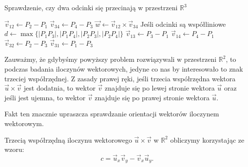 \begin{algorithm}[H]
	\caption{Sprawdzenie, czy dwa odcinki się przecinają w przestrzeni $\mathbb{R}^3$}
	\begin{algorithmic}[1]
		\State \Return \true
		\EndIf
		\State $\vec{v}_{12} \gets P_2 - P_1$
		\State $\vec{v}_{34} \gets P_4 - P_3$
		\State $\vec{w} \gets \vec{v}_{12} \times \vec{v}_{34}$	
		 \Comment Jeśli odcinki są współliniowe
		\State $d \gets \max\{|P_1P_3|, |P_1P_4|, |P_2P_3|, |P_2P_4|\}$
		\State \Return \true
		\EndIf
		\EndIf
		\State $\vec{v}_{13} \gets P_3 - P_1$
		\State $\vec{v}_{14} \gets P_4 - P_1$
		\State \Return \false
		\EndIf
		\State $\vec{v}_{32} \gets P_2 - P_3$
		\State $\vec{v}_{31} \gets P_1 - P_3$
		\State \Return \false
		\EndIf
		\State \Return \true
		\EndProcedure
	\end{algorithmic}
	\label{segment_intersection_r3}
\end{algorithm}

Zauważmy, że gdybyśmy powyższy problem rozwiązywali w przestrzeni $\mathbb{R}^2$,
to podczas badania iloczynów wektorowych, jedyne co nas by interesowało
to znak trzeciej współrzędnej. Z zasady prawej ręki, jeśli
trzecia współrzędna wektora 
$\vec{u} \times \vec{v}$ jest dodatnia, to wektor $\vec{v}$
znajduje się po lewej stronie wektora $\vec{u}$ oraz jeśli 
jest ujemna, to wektor $\vec{v}$
znajduje się po prawej stronie wektora $\vec{u}$. 

Fakt ten znacznie upraszcza sprawdzanie orientacji wektorów iloczynem wektorowym.

Trzecią współrzędną iloczynu wektorowego $\vec{u} \times \vec{v}$ w $\mathbb{R}^2$
obliczymy korzystając ze wzoru:
\[c = \vec{u}_x \vec{v}_y - \vec{v}_x \vec{u}_y.\]




